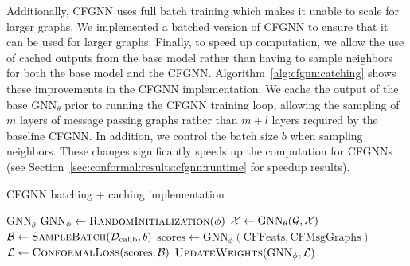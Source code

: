 Additionally, CFGNN uses full batch training which makes it unable to scale for larger graphs.
We implemented a batched version of CFGNN to ensure that it can be used for larger graphs.
Finally, to speed up computation, we allow the use of cached outputs from the base model rather than having to sample neighbors for both the base model and the CFGNN.
Algorithm~\ref{alg:cfgnn:catching} shows these improvements in the CFGNN implementation.
We cache the output of the base $\text{GNN}_\theta$ prior to running the CFGNN training loop, allowing the sampling of $m$ layers of message passing graphs rather than $m + l$ layers required by the baseline CFGNN.
In addition, we control the batch size $b$ when sampling neighbors.
These changes significantly speeds up the computation for CFGNNs (see Section~\ref{sec:conformal:results:cfgnn:runtime} for speedup results).
\begin{algorithm}
    \caption{CFGNN batching + caching implementation}\label{alg:cfgnn:catching}
    \begin{algorithmic}[1]
    \State $\text{GNN}_{\theta}$ 
    \State $\text{GNN}_{\phi} \gets \Call{\text{RandomInitialization}}{\phi}$ 
        \State ${\mathcal{X}} \gets \text{GNN}_{\theta}({\mathcal{G}}, {\mathcal{X}})$ 
    \EndIf
        \State $\gB \gets \Call{\text{SampleBatch}}{\calib, b}$ 
        \Else
        \EndIf
        \State $\text{scores} \gets \text{GNN}_{\phi}(\text{CFFeats}, \text{CFMsgGraphs})$
        \State $\gL \gets \Call{\text{ConformalLoss}}{\text{scores}, \gB}$
        \State $\Call{\text{UpdateWeights}}{\text{GNN}_\phi, \gL}$
    \EndProcedure
    \end{algorithmic}
\end{algorithm}


